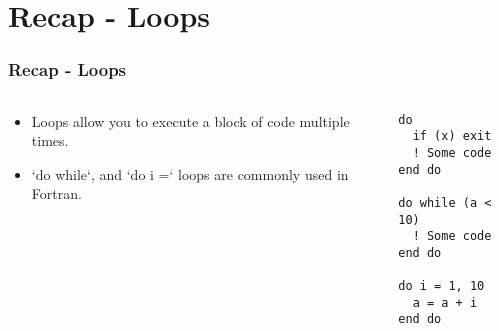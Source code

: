 \documentclass[10pt]{beamer}
\begin{document}
\section{Recap - Loops}

\begin{frame}[fragile]
  \frametitle{Recap - Loops}
  \begin{columns}[T]
    \begin{column}{0.5\textwidth}
    \begin{itemize}
        \item Loops allow you to execute a block of code multiple times.
        \item `do while`, and `do i =` loops are commonly used in Fortran.
      \end{itemize}
    \end{column}

    \begin{column}{0.5\textwidth}
      \begin{lstlisting}
do
  if (x) exit
  ! Some code
end do

do while (a < 10)
  ! Some code
end do

do i = 1, 10
  a = a + i
end do
      \end{lstlisting}
    \end{column}
  \end{columns}
\end{frame}
\end{document}
